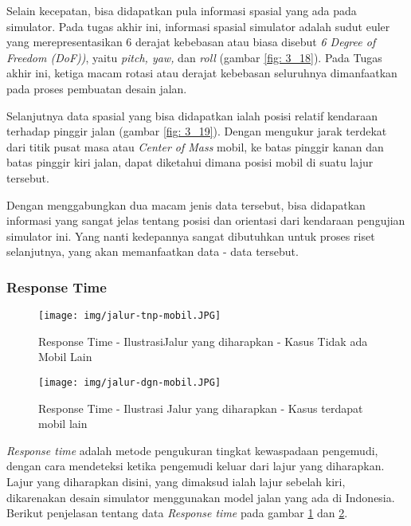         Selain kecepatan, bisa didapatkan pula informasi spasial yang ada pada simulator. Pada tugas akhir ini, informasi spasial simulator adalah sudut euler yang merepresentasikan 6 derajat kebebasan atau biasa disebut \textit{6 Degree of Freedom (DoF))}, yaitu \textit{pitch, yaw,} dan \textit{roll} (gambar \ref{fig: 3_18}). Pada Tugas akhir ini, ketiga macam rotasi atau derajat kebebasan seluruhnya dimanfaatkan pada proses pembuatan desain jalan.
        
        \par Selanjutnya data spasial yang bisa didapatkan ialah posisi relatif kendaraan terhadap pinggir jalan (gambar \ref{fig: 3_19}). Dengan mengukur jarak terdekat dari titik pusat masa atau \textit{Center of Mass} mobil, ke batas pinggir kanan dan batas pinggir kiri jalan, dapat diketahui dimana posisi mobil di suatu lajur tersebut.
        
        \par Dengan menggabungkan dua macam jenis data tersebut, bisa didapatkan informasi yang sangat jelas tentang posisi dan orientasi dari kendaraan pengujian simulator ini. Yang nanti kedepannya sangat dibutuhkan untuk proses riset selanjutnya, yang akan memanfaatkan data - data tersebut.
        
        \subsubsection{Response Time}
        
        \begin{figure}  [!htb]
	        \captionsetup{justification=centering}
	        \texttt{[image: img/jalur-tnp-mobil.JPG]}
	        \caption{Response Time - IlustrasiJalur yang diharapkan - Kasus Tidak ada Mobil Lain}
	        \label{fig: 3_20}
        \end{figure}
        
        \begin{figure}  [!htb]
	        \captionsetup{justification=centering}
	        \texttt{[image: img/jalur-dgn-mobil.JPG]}
	        \caption{Response Time - Ilustrasi Jalur yang diharapkan - Kasus terdapat mobil lain}
	        \label{fig: 3_21}
        \end{figure}
        
        \textit{Response time} adalah metode pengukuran tingkat kewaspadaan pengemudi, dengan cara mendeteksi ketika pengemudi keluar dari lajur yang diharapkan. Lajur yang diharapkan disini, yang dimaksud ialah lajur sebelah kiri, dikarenakan desain simulator menggunakan model jalan yang ada di Indonesia. Berikut penjelasan tentang data \textit{Response time} pada gambar \ref{fig: 3_20} dan \ref{fig: 3_21}.
        
